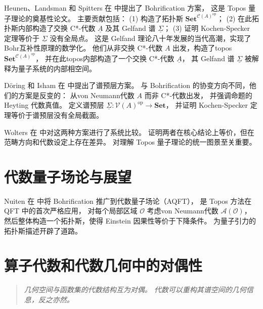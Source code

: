 \documentclass[10pt, openany]{book}
\begin{document}
Heunen、Landsman 和 Spitters 在 \cite{HeunenLandsmanSpitters2009} 中提出了 Bohrification 方案，
这是 Topos 量子理论的奠基性论文。
主要贡献包括：
(1) 构造了拓扑斯 \(\mathbf{Set}^{\mathcal{C}(A)^{\mathrm{op}}}\)；
(2) 在此拓扑斯内部构造了交换 C*-代数 \(\underline{A}\) 及其 Gelfand 谱 \(\underline{\Sigma}\)；
(3) 证明 Kochen-Specker 定理等价于 \(\underline{\Sigma}\) 没有全局点。
这是 Gelfand 理论八十年发展的当代高潮，实现了Bohr互补性原理的数学化。
他们从非交换 C*-代数 \(A\) 出发，构造了topos \(\mathbf{Set}^{\mathcal{C}(A)^{\mathrm{op}}}\)，
并在此topos内部构造了一个交换 C*-代数 \(\underline{A}\)，
其 Gelfand 谱 \(\underline{\Sigma}\) 被解释为量子系统的内部相空间。

Döring 和 Isham 在 \cite{DoeringIsham2008a,DoeringIsham2008b,DoeringIsham2010} 中提出了谱预层方案。
与 Bohrification 的协变方向不同，他们的方案是反变的：
从von Neumann代数 \(A\) 而非 C*-代数出发，
并强调命题的 Heyting 代数真值。
定义谱预层 \(\underline{\Sigma}:\mathcal{V}(A)^{\mathrm{op}}\to\mathbf{Set}\)，
并证明 Kochen-Specker 定理等价于谱预层没有全局截面。

Wolters 在 \cite{Wolters2013} 中对这两种方案进行了系统比较。
证明两者在核心结论上等价，但在范畴方向和代数设定上存在差异。
对理解 Topos 量子理论的统一图景至关重要。

\section{代数量子场论与展望}

Nuiten 在 \cite{Nuiten2013} 中将 Bohrification 推广到代数量子场论（AQFT），
是 Topos 方法在 QFT 中的首次严格应用，
对每个局部区域 \(\mathcal{O}\) 考虑von Neumann代数 \(\mathcal{A}(\mathcal{O})\)，
然后整体构造一个拓扑斯，使得 Einstein 因果性等价于下降条件。
为量子引力的拓扑斯描述开辟了道路。

\section{算子代数和代数几何中的对偶性}

\begin{quote}
\emph{几何空间与函数集的代数结构互为对偶。
代数可以重构其谱空间的几何信息，反之亦然。}
\end{quote}
\end{document}
